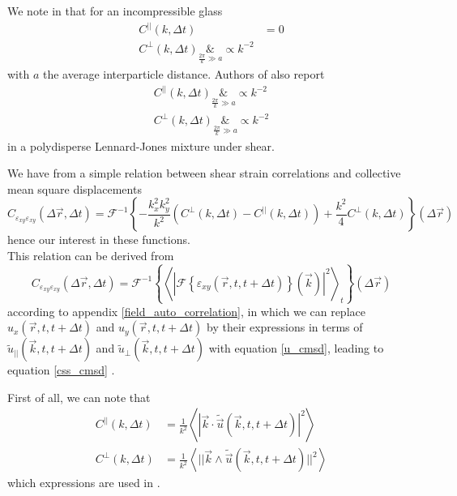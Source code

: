 \documentclass[class=report, float=false, crop=false]{standalone}
\begin{document}
We note in \cite{illing2016strain} that for an incompressible glass
\begin{equation}
\begin{aligned}
C^{||}(k, \Delta t) &= 0\\
C^{\perp}(k, \Delta t) \underset{\frac{2\pi}{k} \gg a}&{\propto} k^{-2}
\end{aligned}
\end{equation}
with $a$ the average interparticle distance. Authors of \cite{leonforte2005continuum} also report
\begin{equation}
\begin{aligned}
C^{||}(k, \Delta t) \underset{\frac{2\pi}{k} \gg a}&{\propto} k^{-2}\\
C^{\perp}(k, \Delta t) \underset{\frac{2\pi}{k} \gg a}&{\propto} k^{-2}
\end{aligned}
\end{equation}
in a polydisperse Lennard-Jones mixture under shear.


We have from \cite{illing2016strain} a simple relation between shear strain correlations and collective mean square displacements
\begin{equation}
C_{\varepsilon_{xy}\varepsilon_{xy}}(\Delta \vec{r}, \Delta t) = \mathcal{F}^{-1}\left\{-\frac{k_x^2k_y^2}{k^2}\left(C^{\perp}(k, \Delta t) - C^{||}(k, \Delta t)\right) + \frac{k^2}{4}C^{\perp}(k, \Delta t)\right\}(\Delta \vec{r})
\label{css_cmsd}
\end{equation}
hence our interest in these functions.\\

This relation can be derived from
\begin{equation}
C_{\varepsilon_{xy}\varepsilon_{xy}}(\Delta \vec{r}, \Delta t) = \mathcal{F}^{-1}\left\{\left<|\mathcal{F}\left\{\varepsilon_{xy}(\vec{r}, t, t + \Delta t)\right\}(\vec{k})|^2\right>_t\right\}(\Delta \vec{r})
\label{css_from_ft}
\end{equation}
according to appendix \ref{field_auto_correlation}, in which we can replace $u_x(\vec{r}, t, t + \Delta t)$ and $u_y(\vec{r}, t, t + \Delta t)$ by their expressions in terms of $\tilde{u}_{||}(\vec{k}, t, t + \Delta t)$ and $\tilde{u}_{\perp}(\vec{k}, t, t + \Delta t)$ with equation \ref{u_cmsd}, leading to equation \ref{css_cmsd} \cite{stackexchange}.


First of all, we can note that
\begin{equation}
\begin{aligned}
C^{||}(k, \Delta t) &= \frac{1}{k^2}\left<|\vec{k}\cdot\tilde{\vec{u}}(\vec{k}, t, t + \Delta t)|^2\right>\\
C^{\perp}(k, \Delta t) &= \frac{1}{k^2}\left<||\vec{k}\wedge\tilde{\vec{u}}(\vec{k}, t, t + \Delta t)||^2\right>
\end{aligned}
\label{cmsd_k}
\end{equation}
which expressions are used in \cite{leonforte2005continuum}.\\
\end{document}
